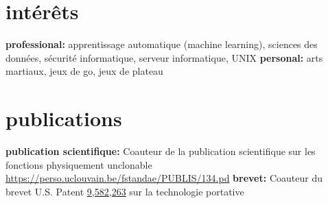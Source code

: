 \documentclass[]{friggeri-cv} %
\begin{document}
\section{intérêts}

\textbf{professional:} apprentissage automatique (machine learning), sciences
des données, sécurité informatique, serveur informatique, UNIX
\medbreak
\textbf{personal:} arts martiaux, jeux de go, jeux de plateau


\section{publications}

\textbf{publication scientifique:} Coauteur de la publication scientifique sur
les fonctions physiquement unclonable
\href{https://perso.uclouvain.be/fstandae/PUBLIS/134.pd}{https://perso.uclouvain.be/fstandae/PUBLIS/134.pd}
\medbreak
\textbf{brevet:} Coauteur du brevet U.S. Patent
\href{http://patft.uspto.gov/netacgi/nph-Parser?Sect2=PTO1&Sect2=HITOFF&p=1&u=/netahtml/PTO/search-bool.html&r=1&f=G&l=50&d=PALL&RefSrch=yes&Query=PN/9582263}{9,582,263} sur la technologie portative

\end{document}
